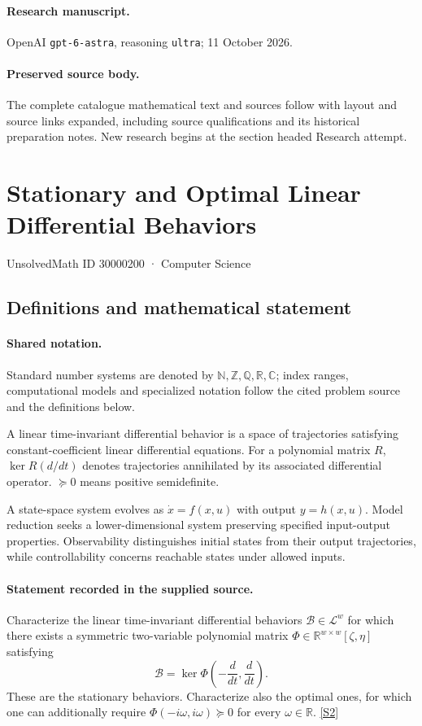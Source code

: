 \documentclass[11pt]{article}
\begin{document}
\paragraph{Research manuscript.} OpenAI \texttt{gpt-6-astra}, reasoning \texttt{ultra}; 11 October 2026.
\paragraph{Preserved source body.} The complete catalogue mathematical text and sources follow with layout and source links expanded, including source qualifications and its historical preparation notes. New research begins at the section headed Research attempt.

\section{Stationary and Optimal Linear Differential Behaviors}\label{30000200}
{\small UnsolvedMath ID 30000200 · Computer Science}
\subsection{Definitions and mathematical statement}

\paragraph{Shared notation.}Standard number systems are denoted by $\mathbb N,\mathbb Z,\mathbb Q,\mathbb R,\mathbb C$; index ranges, computational models and specialized notation follow the cited problem source and the definitions below.


A linear time-invariant differential behavior is a space of trajectories satisfying constant-coefficient linear differential equations. For a polynomial matrix $R$, $\ker R(d/dt)$ denotes trajectories annihilated by its associated differential operator. $\succeq0$ means positive semidefinite.

A state-space system evolves as $\dot x=f(x,u)$ with output $y=h(x,u)$. Model reduction seeks a lower-dimensional system preserving specified input-output properties. Observability distinguishes initial states from their output trajectories, while controllability concerns reachable states under allowed inputs.
\paragraph{Statement recorded in the supplied source.}
Characterize the linear time-invariant differential behaviors $\mathcal{B}\in\mathcal{L}^w$ for which there exists a symmetric two-variable polynomial matrix $\Phi\in\mathbb{R}^{w\times w}[\zeta,\eta]$ satisfying $$\mathcal{B}=\ker\Phi\!\left(-\frac{d}{dt},\frac{d}{dt}\right).$$ These are the stationary behaviors. Characterize also the optimal ones, for which one can additionally require $\Phi(-i\omega,i\omega)\succeq0$ for every $\omega\in\mathbb{R}$. \href{https://doi.org/10.4171/owr/2005/11}{[S2]}
\end{document}
